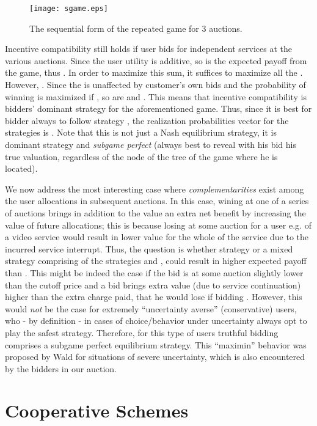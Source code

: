 \documentclass[a4paper]{article}
\begin{document}
\begin{figure}[htbp]
	\centering\texttt{[image: sgame.eps]}
	\caption{The sequential form of the repeated game for 3 auctions.}
	\label{fig:sgame}
\end{figure}

Incentive compatibility still holds if user bids for independent services at the
various auctions. Since the user utility is additive, 
so is the expected payoff from the  game, thus . 
In order to maximize this sum, it suffices to maximize all the . However, 
. Since the 
is unaffected by customer's own bids and the probability of winning is
maximized if , so are  and . This means that incentive
compatibility is bidders' dominant strategy for the aforementioned game.
Thus, since it is best for bidder always to follow strategy , the realization 
probabilities vector for the strategies  is . Note that
this is not just a Nash equilibrium strategy, it is dominant strategy and
{\em subgame perfect} (always best to reveal with his bid his true valuation, regardless
of the node of the tree of the game where he is located).


We now address the most interesting case where {\em complementarities} exist 
among the user allocations in subsequent auctions. In this case, wining at
one of a series of auctions brings in addition to the value 
an extra net benefit by increasing the value of future allocations; this is 
because losing at some auction for a user e.g. of a video service would result
in lower value for the whole of the service due to the incurred service interrupt. 
Thus, the question is whether strategy  
or a mixed strategy comprising of the strategies  and ,
could result in higher expected payoff than . This 
might be indeed the case if the bid   is at some auction slightly lower 
than the cutoff price and a bid  
brings extra value (due to service continuation) higher than the extra 
charge paid, that he would lose if bidding . 
However, this would {\em not} be the case for 
extremely ``uncertainty averse'' (conservative) 
users, who - by definition - in cases of choice/behavior under  {uncertainty} 
always opt to play the safest strategy. Therefore, for this type of users
truthful bidding comprises a subgame perfect equilibrium strategy.  
This ``maximin'' behavior was  proposed by Wald \cite{Wald} for situations of 
severe uncertainty, which is also encountered by the bidders in our auction. 



\section{Cooperative Schemes}\label{sec:coop}
\end{document}
